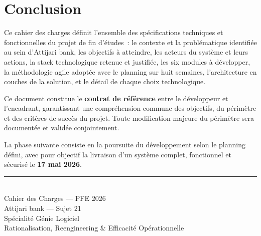 \documentclass[12pt,a4paper]{report}
\begin{document}
\chapter*{Conclusion}

Ce cahier des charges définit l'ensemble des spécifications techniques et fonctionnelles du projet de fin d'études~: le contexte et la problématique identifiée au sein d'Attijari bank, les objectifs à atteindre, les acteurs du système et leurs actions, la stack technologique retenue et justifiée, les six modules à développer, la méthodologie agile adoptée avec le planning sur huit semaines, l'architecture en couches de la solution, et le détail de chaque choix technologique.

Ce document constitue le \textbf{contrat de référence} entre le développeur et l'encadrant, garantissant une compréhension commune des objectifs, du périmètre et des critères de succès du projet. Toute modification majeure du périmètre sera documentée et validée conjointement.

La phase suivante consiste en la poursuite du développement selon le planning défini, avec pour objectif la livraison d'un système complet, fonctionnel et sécurisé le \textbf{17 mai 2026}.

\vspace{1cm}
\begin{center}
\rule{0.5\textwidth}{0.4pt}\\[0.3cm]
{\small\textcolor{attijariGray}{Cahier des Charges --- PFE 2026}}\\
{\small\textcolor{attijariGray}{Attijari bank --- Sujet 21}}\\
{\small\textcolor{attijariGray}{Spécialité Génie Logiciel}}\\
{\small\textcolor{attijariGray}{Rationalisation, Reengineering \& Efficacité Opérationnelle}}
\end{center}
\end{document}
